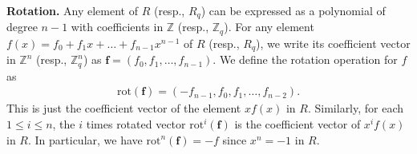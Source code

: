 \documentclass[12pt,a4paper]{article}
\numberwithin{equation}{section}
\begin{document}
\textbf{Rotation.} Any element of $R$ (resp., $R_q$) can be expressed as a polynomial of degree $n - 1$ with coefficients in $\mathbb{Z}$ (resp., $\mathbb{Z}_q$). For any element $f(x) = f_0 + f_1x + \ldots + f_{n-1}x^{n-1}$ of $R$ (resp., $R_q$), we write its coefficient vector in $\mathbb{Z}^n$ (resp., $\mathbb{Z}^n_q$) as $\mathbf{f} = (f_0, f_1, \ldots , f_{n-1})$. We define the rotation operation for $f$ as  
\begin{align*}
    \mathrm{rot}(\mathbf{f}) = (-f_{n-1}, f_0, f_1, \ldots , f_{n-2}).
\end{align*}
This is just the coefficient vector of the element $xf (x)$ in $R$. Similarly, for each $1 \leq i \leq  n$, the $i$ times rotated vector $\mathrm{rot}^i(\mathbf{f})$ is the coefficient vector of $x^if(x)$ in $R$. 
In particular, we have $\mathrm{rot}^n(\mathbf{f}) = -f$ since $x^n = -1$ in $R$.
\end{document}
